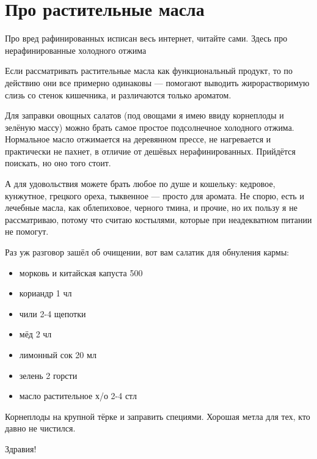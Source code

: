 \section{Про растительные масла}

Про вред рафинированных исписан весь интернет, читайте сами. Здесь про нерафинированные холодного отжима

Если рассматривать растительные масла как функциональный продукт, то по действию они все примерно одинаковы — помогают выводить жирорастворимую слизь со стенок кишечника, и различаются только ароматом. 

Для заправки овощных салатов (под овощами я имею ввиду корнеплоды и зелёную массу) можно брать самое простое подсолнечное холодного отжима. Нормальное масло отжимается на деревянном прессе, не нагревается и практически не пахнет, в отличие от дешёвых нерафинированных. Прийдётся поискать, но оно того стоит.

А для удовольствия можете брать любое по душе и кошельку: кедровое, кунжутное, грецкого ореха, тыквенное — просто для аромата.
Не спорю, есть и лечебные масла, как облепиховое, черного тмина, и прочие, но их пользу я не рассматриваю, потому что считаю костылями, которые при неадекватном питании не помогут.

Раз уж разговор зашёл об очищении, вот вам салатик для обнуления кармы:
\begin{itemize}

\item морковь и китайская капуста 500
\item кориандр 1 чл
\item чили 2-4 щепотки
\item мёд 2 чл
\item лимонный сок 20 мл
\item зелень 2 горсти
\item масло растительное х/о 2-4 стл
\end{itemize}

Корнеплоды на крупной тёрке и заправить специями. Хорошая метла для тех, кто давно не чистился. 


Здравия!

